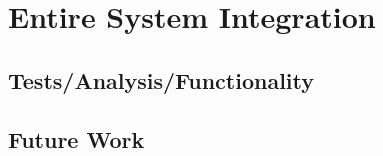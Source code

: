 %
\section{Entire System Integration}

\subsection{Tests/Analysis/Functionality}

\subsection{Future Work}
